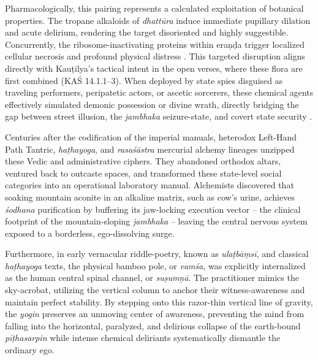 \documentclass[11pt,twoside,letterpaper]{article}
\begin{document}
Pharmacologically, this pairing represents a calculated exploitation of botanical properties. The tropane alkaloids of \textit{dhattūra} induce immediate pupillary dilation and acute delirium, rendering the target disoriented and highly suggestible. Concurrently, the ribosome-inactivating proteins within eraṇḍa trigger localized cellular necrosis and profound physical distress \citep{toxicology_datura, rip_necrosis,scopolamine_suggest}. This targeted disruption aligns directly with Kauṭilya's tactical intent in the open verses, where these flora are first combined (KAŚ 14.1.1--3). When deployed by state spies disguised as traveling performers, peripatetic actors, or ascetic sorcerers, these chemical agents effectively simulated demonic possession or divine wrath, directly bridging the gap between street illusion, the \textit{jambhaka} seizure-state, and covert state security \citep{kangle1972, olivelle2013}.

Centuries after the codification of the imperial manuals, heterodox Left-Hand Path Tantric, \textit{haṭhayoga}, and \textit{rasaśāstra} mercurial alchemy lineages unzipped these Vedic and administrative ciphers. They abandoned orthodox altars, ventured back to outcaste spaces, and transformed these state-level social categories into an operational laboratory manual. Alchemists discovered that soaking mountain aconite in an alkaline matrix, such as cow's urine, achieves \textit{śodhana} purification by buffering its jaw-locking execution vector -- the clinical footprint of the mountain-sloping \textit{jambhaka} -- leaving the central nervous system exposed to a borderless, ego-dissolving surge. 

Furthermore, in early vernacular riddle-poetry, known as \textit{ulaṭbāṃsī}, and classical \textit{haṭhayoga} texts, the physical bamboo pole, or \textit{vamśa}, was explicitly internalized as the human central spinal channel, or \textit{suṣumṇā}. The practitioner mimics the sky-acrobat, utilizing the vertical column to anchor their witness-awareness and maintain perfect stability. By stepping onto this razor-thin vertical line of gravity, the \textit{yogin} preserves an unmoving center of awareness, preventing the mind from falling into the horizontal, paralyzed, and delirious collapse of the earth-bound \textit{pīṭhasarpin} while intense chemical deliriants systematically dismantle the ordinary ego.
\end{document}
